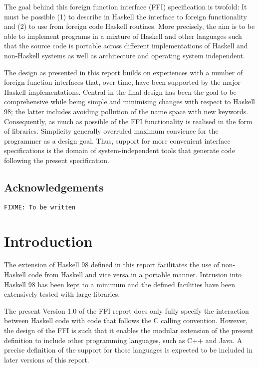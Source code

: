 \documentclass[a4paper,twosides]{article}
\begin{document}
The goal behind this foreign function interface (FFI) specification is
twofold: It must be possible (1) to describe in Haskell the interface to
foreign functionality and (2) to use from foreign code Haskell routines.  More
precisely, the aim is to be able to implement programs in a mixture of Haskell
and other languages such that the source code is portable across different
implementations of Haskell and non-Haskell systems as well as architecture
and operating system independent.

The design as presented in this report builds on experiences with a number of
foreign function interfaces that, over time, have been supported by the major
Haskell implementations.  Central in the final design has been the goal to be
comprehensive while being simple and minimising changes with respect to
Haskell 98; the latter includes avoiding pollution of the name space with new
keywords.  Consequently, as much as possible of the FFI functionality is
realised in the form of libraries.  Simplicity generally overruled maximum
convience for the programmer as a design goal.  Thus, support for more
convenient interface specifications is the domain of system-independent tools
that generate code following the present specification.

\subsection*{Acknowledgements}

\begin{verbatim}
FIXME: To be written
\end{verbatim}


\newpage
\section{Introduction}

The extension of Haskell 98 defined in this report facilitates the use of
non-Haskell code from Haskell and vice versa in a portable manner.  Intrusion
into Haskell 98 has been kept to a minimum and the defined facilities have
been extensively tested with large libraries.

The present Version 1.0 of the FFI report does only fully specify the
interaction between Haskell code with code that follows the C calling
convention.  However, the design of the FFI is such that it enables the
modular extension of the present definition to include other programming
languages, such as C++ and Java.  A precise definition of the support for
those languages is expected to be included in later versions of this report.
\end{document}

